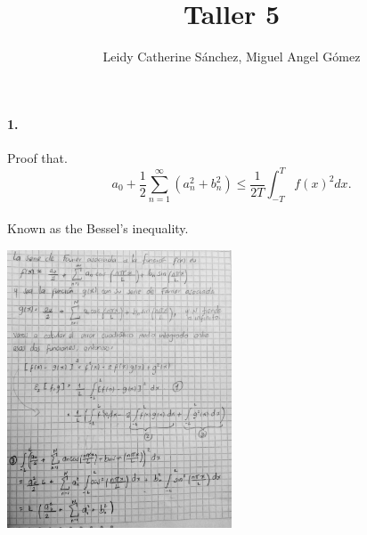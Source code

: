 \documentclass{article}
\title{Taller 5}
\author{Leidy Catherine Sánchez, Miguel Angel Gómez}
\begin{document}
	\maketitle
\paragraph{1.}Proof that.
$$a_0 + \frac{1}{2} \sum_{n=1}^{\infty} (a_n^2 + b_n^2) \leq \frac{1}{2T} \int_{-T}^{T} f(x)^2 dx.$$
\paragraph{}Known as the Bessel's inequality.
\begin{center}
	\includegraphics[width=0.5\textwidth]{img/1.jpeg}
\end{center}
\end{document}
